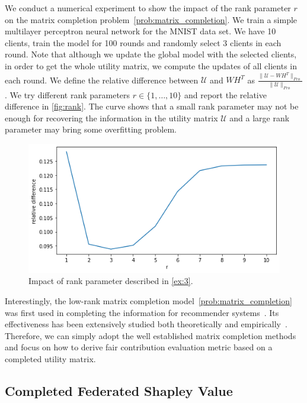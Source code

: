 \begin{example} \label{ex:3}
    We conduct a numerical experiment to show the impact of the rank parameter $r$ on the matrix completion problem~\eqref{prob:matrix_completion}. We train a simple multilayer perceptron neural network for the MNIST data set. We have 10 clients, train the model for 100 rounds and randomly select 3 clients in each round. Note that although we update the global model with the selected clients, in order to get the whole utility matrix, we compute the updates of all clients in each round. We define the relative difference between $\mathcal{U}$ and $WH^T$ as 
    $\frac{\|\mathcal{U} - WH^T\|_{Fro}}{\|\mathcal{U}\|_{Fro}}$.
    We try different rank parameters $r \in \{1, \dots, 10\}$ and report the relative difference in \autoref{fig:rank}. The curve shows that a small rank parameter may not be enough for recovering the information in the utility matrix $\mathcal{U}$ and a large rank parameter may bring some overfitting problem.  
    
    \begin{figure}[t]
        \centering
        \includegraphics[width=.7\textwidth]{./figures/rank_impact.png}
        \caption{Impact of rank parameter described in \autoref{ex:3}.}
        \label{fig:rank}
    \end{figure}
    
\end{example}

Interestingly, the low-rank matrix completion model~\eqref{prob:matrix_completion} was first used in completing the information for recommender systems~\cite{koren2009matrix}. Its effectiveness has been extensively studied both theoretically and empirically~\cite{keshavan2012efficient, sun2016guaranteed}.  Therefore, we can simply adopt the well established matrix completion methods~\cite{yu2014parallel, chin2016libmf} and focus on how to derive fair contribution evaluation metric based on a completed utility matrix.
    
\subsection{Completed Federated Shapley Value} \label{sec:5.3}

